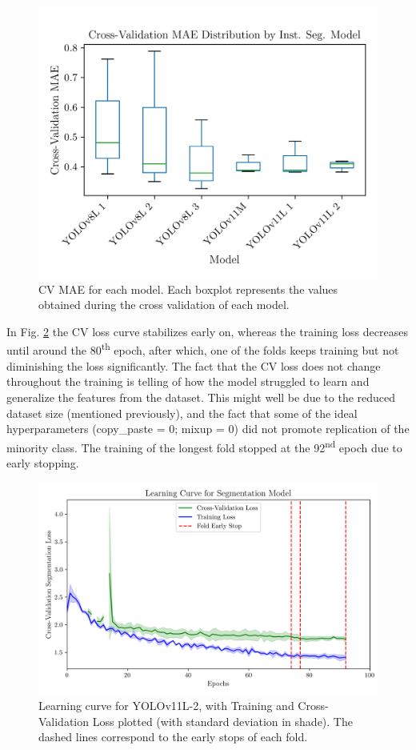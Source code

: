 \documentclass[conference]{IEEEtran}
\begin{document}
\begin{figure}[H]
    \centering
    \includegraphics[width=1\linewidth]{assets/model02_mae_boxplot.png}
    \caption{CV MAE for each model. Each boxplot represents the values obtained during the cross validation of each model.}
    \label{fig:model02_mae_boxplot}
\end{figure}

In Fig. \ref{fig:model02_lc} the CV loss curve stabilizes early on, whereas the training loss decreases until around the 80\textsuperscript{th} epoch, after which, one of the folds keeps training but not diminishing the loss significantly. The fact that the CV loss does not change throughout the training is telling of how the model struggled to learn and generalize the features from the dataset. This might well be due to the reduced dataset size (mentioned previously), and the fact that some of the ideal hyperparameters (copy\_paste = 0; mixup = 0) did not promote replication of the minority class. The training of the longest fold stopped at the 92\textsuperscript{nd} epoch due to early stopping.

\begin{figure}[H]
    \centering
    \includegraphics[width=1\linewidth]{assets/model02_lc.png}
    \caption{Learning curve for YOLOv11L-2, with Training and Cross-Validation Loss plotted (with standard deviation in
shade). The dashed lines correspond to the early stops of each fold.}
    \label{fig:model02_lc}
\end{figure}
\end{document}
